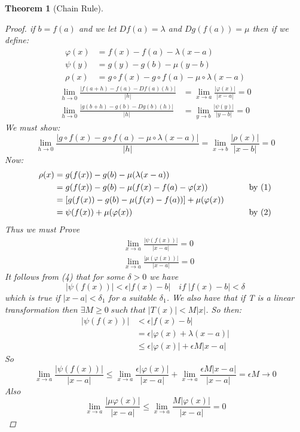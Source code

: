 \documentclass[11pt]{article}
\newtheorem{theorem}{Theorem}[section]
\begin{document}
\begin{theorem}[Chain Rule]
\begin{proof}
if $b=f(a)$ and we let $Df(a) = \lambda$ and $Dg(f(a))=\mu$ then if we define:
\begin{align}
\varphi(x) &=f(x)-f(a) -\lambda(x-a)\\
\psi(y) &= g(y) - g(b) - \mu(y-b)\\
\rho(x) &= g\circ f(x) - g\circ f(a) - \mu \circ \lambda (x -a)
\end{align}
\begin{align}
\lim_{h \to 0}\frac{|f(a+h)-f(a) -Df(a)(h)|}{|h|} &= \lim_{x \to a}\frac{|\varphi(x)|}{|x-a|} = 0\\
\lim_{h \to 0}\frac{|g(b+h)-g(b) -Dg(b)(h)|}{|h|} &= \lim_{y \to b}\frac{|\psi(y)|}{|y-b|} = 0
\end{align}
We must show:
\[\lim_{h \to 0}\frac{|g\circ f(x) - g\circ f(a) - \mu \circ \lambda (x -a)|}{|h|} = \lim_{x \to b}\frac{|\rho(x)|}{|x-b|} = 0\]
Now:
\begin{alignat*}{2}
\rho(x) &=g(f(x)) - g(b) - \mu(\lambda(x-a)) &\qquad & \\
&= g(f(x)) - g(b) - \mu(f(x) - f(a) - \varphi(x)) &\qquad & \textmd{by (1)}\\
&= [g(f(x)) - g(b) - \mu(f(x)-f(a))] + \mu(\varphi(x)) &\qquad &\\
&= \psi(f(x)) + \mu(\varphi(x)) &\qquad & \textmd{by (2)}
\end{alignat*}
Thus we must Prove
\begin{align}
&\lim_{x \to a}\frac{|\psi(f(x))|}{|x-a|} = 0\\
&\lim_{x \to a}\frac{|\mu(\varphi(x))|}{|x-a|} = 0
\end{align}
It follows from (4) that for some $\delta > 0 $  we have
\[|\psi(f(x))|<\epsilon|f(x) - b| \quad if\; |f(x) - b|<\delta\]
which is true if $|x-a|< \delta_{1} $ for a suitable $\delta_{1}$. We also have that if T is a linear transformation then $\exists M \geq 0\; such \; that\;  |T(x)|<M|x|$. So then:
\begin{align*}
|\psi(f(x))| &<\epsilon|f(x) - b| \\
&= \epsilon|\varphi(x) + \lambda(x-a)|\\
& \leq \epsilon|\varphi(x)| + \epsilon M|x-a|
\end{align*}
So
\[\lim_{x \to a}\frac{|\psi(f(x))|}{|x-a|} \leq \lim_{x \to a}\frac{\epsilon|\varphi(x)|}{|x-a|}  + \lim_{x \to a}\frac{\epsilon M|x-a|}{|x-a|} = \epsilon M \rightarrow 0\]
Also
\[\lim_{x \to a}\frac{|\mu\varphi(x)|}{|x-a|} \leq \lim_{x \to a}\frac{M|\varphi(x)|}{|x-a|} = 0\]
\end{proof}
\end{theorem}
\end{document}
